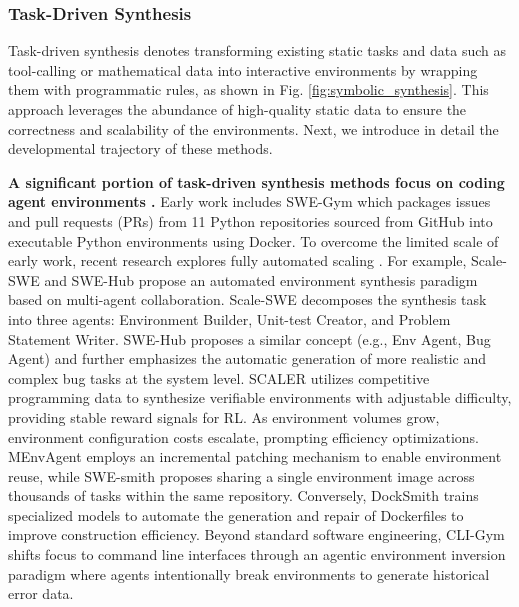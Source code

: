 \subsubsection{Task-Driven Synthesis}
\label{sec:task driven synthesis}

Task-driven synthesis denotes transforming existing static tasks \cite{Generalized_Planning, BYTESIZED32, Exploration_Walk, Text2World, WorldCoder} and data such as tool-calling \cite{EnvScaler, AgentScaler, Agent_CPT} or mathematical data \cite{Nemotron-Terminal, LLM-in-Sandbox} into interactive environments by wrapping them with programmatic rules, as shown in Fig. \ref{fig:symbolic_synthesis}. This approach leverages the abundance of high-quality static data to ensure the correctness and scalability of the environments. Next, we introduce in detail the developmental trajectory of these methods.

\textbf{A significant portion of task-driven synthesis methods focus on coding agent environments \cite{CodeGym, Agent2World}.} Early work includes SWE-Gym \cite{SWE-Gym} which packages issues and pull requests (PRs) from 11 Python repositories sourced from GitHub into executable Python environments using Docker. To overcome the limited scale of early work, recent research explores fully automated scaling \cite{R2E-Gym,Nemotron-Terminal}. For example, Scale-SWE \cite{Scale-SWE} and SWE-Hub \cite{SWE-Hub} propose an automated environment synthesis paradigm based on multi-agent collaboration. Scale-SWE \cite{Scale-SWE} decomposes the synthesis task into three agents: Environment Builder, Unit-test Creator, and Problem Statement Writer. SWE-Hub \cite{SWE-Hub} proposes a similar concept (e.g., Env Agent, Bug Agent) and further emphasizes the automatic generation of more realistic and complex bug tasks at the system level. SCALER \cite{SCALER} utilizes competitive programming data to synthesize verifiable environments with adjustable difficulty, providing stable reward signals for RL. As environment volumes grow, environment configuration costs escalate, prompting efficiency optimizations. MEnvAgent \cite{MEnvAgent} employs an incremental patching mechanism to enable environment reuse, while SWE-smith \cite{SWE-smith} proposes sharing a single environment image across thousands of tasks within the same repository. Conversely, DockSmith \cite{DockSmith} trains specialized models to automate the generation and repair of Dockerfiles to improve construction efficiency. Beyond standard software engineering, CLI-Gym \cite{CLI-Gym} shifts focus to command line interfaces through an agentic environment inversion paradigm where agents intentionally break environments to generate historical error data. 

